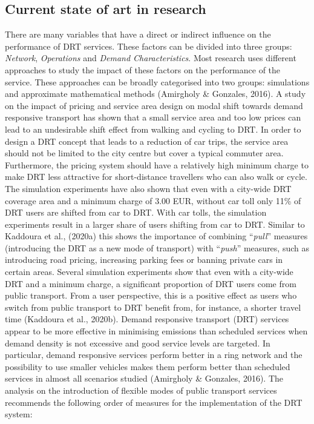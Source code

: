 \documentclass[
]{book}
\begin{document}
\hypertarget{current-state-of-art-in-research-23}{%
\subsection*{Current state of art in research}\label{current-state-of-art-in-research-23}}

There are many variables that have a direct or indirect influence on the performance of DRT services. These factors can be divided into three groups: \emph{Network}, \emph{Operations} and \emph{Demand Characteristics}. Most research uses different approaches to study the impact of these factors on the performance of the service. These approaches can be broadly categorised into two groups: simulations and approximate mathematical methods (Amirgholy \& Gonzales, 2016).
A study on the impact of pricing and service area design on modal shift towards demand responsive transport has shown that a small service area and too low prices can lead to an undesirable shift effect from walking and cycling to DRT. In order to design a DRT concept that leads to a reduction of car trips, the service area should not be limited to the city centre but cover a typical commuter area. Furthermore, the pricing system should have a relatively high minimum charge to make DRT less attractive for short-distance travellers who can also walk or cycle. The simulation experiments have also shown that even with a city-wide DRT coverage area and a minimum charge of 3.00 EUR, without car toll only 11\% of DRT users are shifted from car to DRT. With car tolls, the simulation experiments result in a larger share of users shifting from car to DRT. Similar to Kaddoura et al., (2020a) this shows the importance of combining ``\emph{pull}'' measures (introducing the DRT as a new mode of transport) with ``\emph{push}'' measures, such as introducing road pricing, increasing parking fees or banning private cars in certain areas. Several simulation experiments show that even with a city-wide DRT and a minimum charge, a significant proportion of DRT users come from public transport. From a user perspective, this is a positive effect as users who switch from public transport to DRT benefit from, for instance, a shorter travel time (Kaddoura et al., 2020b).
Demand responsive transport (DRT) services appear to be more effective in minimising emissions than scheduled services when demand density is not excessive and good service levels are targeted. In particular, demand responsive services perform better in a ring network and the possibility to use smaller vehicles makes them perform better than scheduled services in almost all scenarios studied (Amirgholy \& Gonzales, 2016).
The analysis on the introduction of flexible modes of public transport services recommends the following order of measures for the implementation of the DRT system:
\end{document}
